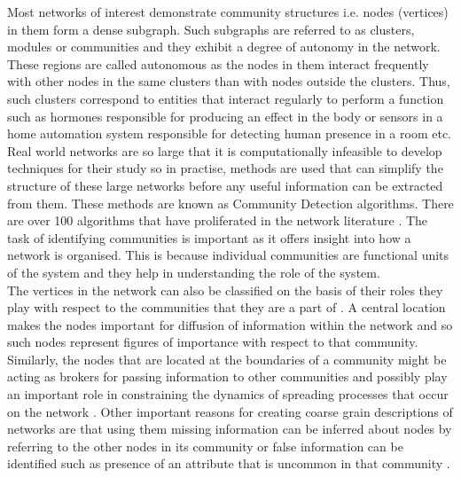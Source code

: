Most networks of interest demonstrate community structures i.e. nodes (vertices) in them form a dense subgraph. Such subgraphs are referred to as clusters, modules or communities and they exhibit a degree of autonomy in the network\cite{aps:1}. These regions are called autonomous as the nodes in them interact frequently with other nodes in the same clusters than with nodes outside the clusters. Thus, such clusters correspond to entities that interact regularly to perform a function such as hormones responsible for producing an effect in the body or sensors in a home automation system responsible for detecting human presence in a room etc. Real world networks are so large that it is computationally infeasible to develop techniques for their study so in practise, methods are used that can simplify the structure of these large networks before any useful information can be extracted from them. These methods are known as Community Detection algorithms. There are over 100 algorithms that have proliferated in the network literature \cite{aps:10} \cite{aps:8}. The task of identifying communities is important as it offers insight into how a network is organised. This is because individual communities are functional units of the system and they help in understanding the role of the system. \\

The vertices in the network can also be classified on the basis of their roles they play with respect to the communities that they are a part of \cite{aps:24}. A central location makes the nodes important for diffusion of information within the network and so such nodes represent figures of importance with respect to that community. Similarly, the nodes that are located at the boundaries of a community might be acting as brokers for passing information to other communities and possibly play an important role in constraining the dynamics of spreading processes that occur on the network \cite{aps:10}. Other important reasons for creating coarse grain descriptions of networks are that using them missing information can be inferred about nodes by referring to the other nodes in its community or false information can be identified such as presence of an attribute that is uncommon in that community \cite{aps:10} \cite{aps:8}.
\\



